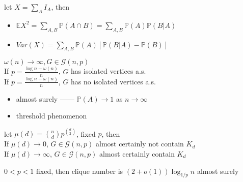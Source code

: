 \begin{fact}
    let $X = \sum_A I_A$, then
    \begin{itemize}
        \item $\mathbb{E}X^2 = \sum_{A, B} \mathbb{P}(A \cap B) = \sum_{A, B} \mathbb{P}(A)\mathbb{P}(B|A)$
        \item $Var(X) = \sum_{A, B} \mathbb{P}(A) [\mathbb{P}(B | A) - \mathbb{P}(B)]$
    \end{itemize}
\end{fact}

\begin{thm}
    $\omega(n) \rightarrow \infty, G \in \mathcal{G}(n, p)$ \\
    If $p = \frac{\log n - \omega(n)}{n}$, $G$ has isolated vertices a.s. \\
    If $p = \frac{\log n + \omega(n)}{n}$, $G$ has no isolated vertices a.s.
\end{thm}

\begin{itemize}
    \item almost surely ------ $\mathbb{P}(A) \rightarrow 1$ as $n \rightarrow \infty$
    \item threshold phenomenon
\end{itemize}

\begin{thm}
    let $\mu(d) = {n \choose d}p^{d \choose 2}$, fixed $p$, then \\
    If $\mu(d) \rightarrow 0$, $G \in \mathcal{G}(n, p)$ almost certainly not contain $K_d$ \\
    If $\mu(d) \rightarrow \infty$, $G \in \mathcal{G}(n, p)$ almost certainly contain $K_d$
\end{thm}

\begin{cor}
    $0 < p < 1$ fixed, then clique number is $(2 + o(1))\log_{1/p}n$ almost surely
\end{cor}


